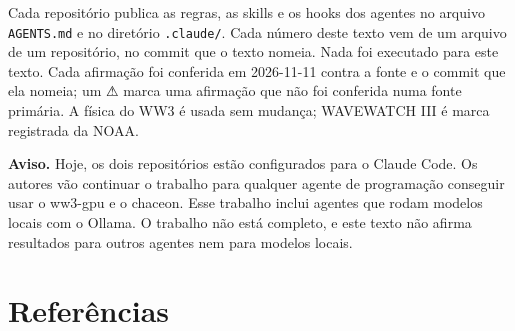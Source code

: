 \documentclass[10pt,a4paper,]{article}
\begin{document}
Cada repositório publica as regras, as skills e os hooks dos agentes no
arquivo \texttt{AGENTS.md} e no diretório \texttt{.claude/}. Cada número
deste texto vem de um arquivo de um repositório, no commit que o texto
nomeia. Nada foi executado para este texto. Cada afirmação foi conferida
em 2026-11-11 contra a fonte e o commit que ela nomeia; um ⚠ marca uma
afirmação que não foi conferida numa fonte primária. A física do WW3 é
usada sem mudança; WAVEWATCH III é marca registrada da NOAA.

\textbf{Aviso.} Hoje, os dois repositórios estão configurados para o
Claude Code. Os autores vão continuar o trabalho para qualquer agente de
programação conseguir usar o ww3-gpu e o chaceon. Esse trabalho inclui
agentes que rodam modelos locais com o Ollama. O trabalho não está
completo, e este texto não afirma resultados para outros agentes nem
para modelos locais.

\section*{Referências}\label{referuxeancias}
\end{document}
